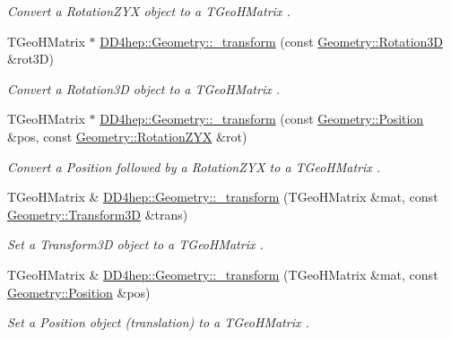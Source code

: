 \begin{DoxyCompactItemize}
\begin{DoxyCompactList}\small\item\em Convert a Rotation\+Z\+YX object to a T\+Geo\+H\+Matrix . \end{DoxyCompactList}\item 
T\+Geo\+H\+Matrix $\ast$ \hyperlink{group___d_d4_h_e_p___g_e_o_m_e_t_r_y_ga2b988c5fb8e427e757080009b3a4856f}{D\+D4hep\+::\+Geometry\+::\+\_\+transform} (const \hyperlink{namespace_d_d4hep_1_1_geometry_a022fecb763315fa2bf39cbb648944a0e}{Geometry\+::\+Rotation3D} \&rot3D)
\begin{DoxyCompactList}\small\item\em Convert a Rotation3D object to a T\+Geo\+H\+Matrix . \end{DoxyCompactList}\item 
T\+Geo\+H\+Matrix $\ast$ \hyperlink{group___d_d4_h_e_p___g_e_o_m_e_t_r_y_gad6f7e93a5f8c5ae037658aa594d2f83b}{D\+D4hep\+::\+Geometry\+::\+\_\+transform} (const \hyperlink{namespace_d_d4hep_1_1_geometry_a55083902099d03506c6db01b80404900}{Geometry\+::\+Position} \&pos, const \hyperlink{namespace_d_d4hep_1_1_geometry_a24667b2b9c3cec3d5239828db4d52189}{Geometry\+::\+Rotation\+Z\+YX} \&rot)
\begin{DoxyCompactList}\small\item\em Convert a Position followed by a Rotation\+Z\+YX to a T\+Geo\+H\+Matrix . \end{DoxyCompactList}\item 
T\+Geo\+H\+Matrix \& \hyperlink{group___d_d4_h_e_p___g_e_o_m_e_t_r_y_gae56d3e609e5195af8ba7271391b608e5}{D\+D4hep\+::\+Geometry\+::\+\_\+transform} (T\+Geo\+H\+Matrix \&mat, const \hyperlink{namespace_d_d4hep_1_1_geometry_aeb4c0356d12fd7be49a0aae50514e64b}{Geometry\+::\+Transform3D} \&trans)
\begin{DoxyCompactList}\small\item\em Set a Transform3D object to a T\+Geo\+H\+Matrix . \end{DoxyCompactList}\item 
T\+Geo\+H\+Matrix \& \hyperlink{group___d_d4_h_e_p___g_e_o_m_e_t_r_y_ga115e4b33b3d4b31fc0c2a2de57c8a14b}{D\+D4hep\+::\+Geometry\+::\+\_\+transform} (T\+Geo\+H\+Matrix \&mat, const \hyperlink{namespace_d_d4hep_1_1_geometry_a55083902099d03506c6db01b80404900}{Geometry\+::\+Position} \&pos)
\begin{DoxyCompactList}\small\item\em Set a Position object (translation) to a T\+Geo\+H\+Matrix . \end{DoxyCompactList}\item 

\end{DoxyCompactItemize}
